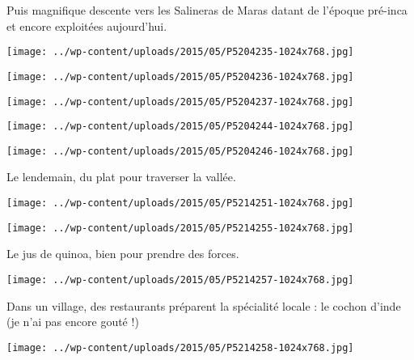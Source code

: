 Puis magnifique descente vers les Salineras de Maras datant de l'époque pré-inca et encore exploitées aujourd'hui. 
\begin{center} \texttt{[image: ../wp-content/uploads/2015/05/P5204235-1024x768.jpg]} \end{center}
\begin{center} \texttt{[image: ../wp-content/uploads/2015/05/P5204236-1024x768.jpg]} \end{center}
\begin{center} \texttt{[image: ../wp-content/uploads/2015/05/P5204237-1024x768.jpg]} \end{center}
\begin{center} \texttt{[image: ../wp-content/uploads/2015/05/P5204244-1024x768.jpg]} \end{center}
\begin{center} \texttt{[image: ../wp-content/uploads/2015/05/P5204246-1024x768.jpg]} \end{center}
\pagebreak

Le lendemain, du plat pour traverser la vallée. 
\begin{center} \texttt{[image: ../wp-content/uploads/2015/05/P5214251-1024x768.jpg]} \end{center}
\begin{center} \texttt{[image: ../wp-content/uploads/2015/05/P5214255-1024x768.jpg]} \end{center}
\pagebreak

Le jus de quinoa, bien pour prendre des forces. 
\begin{center} \texttt{[image: ../wp-content/uploads/2015/05/P5214257-1024x768.jpg]} \end{center}

Dans un village, des restaurants préparent la spécialité locale : le cochon d'inde (je n'ai pas encore gouté !)
\begin{center} \texttt{[image: ../wp-content/uploads/2015/05/P5214258-1024x768.jpg]} \end{center}
\pagebreak

